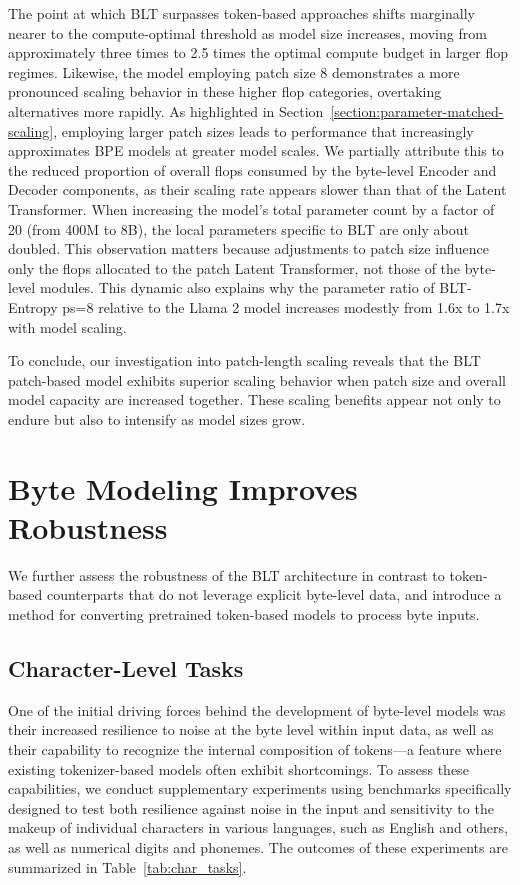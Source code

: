 The point at which {\textsc BLT} surpasses token-based approaches shifts marginally nearer to the compute-optimal threshold as model size increases, moving from approximately three times to 2.5 times the optimal compute budget in larger flop regimes. Likewise, the model employing patch size 8 demonstrates a more pronounced scaling behavior in these higher flop categories, overtaking alternatives more rapidly. As highlighted in Section~\ref{section:parameter-matched-scaling}, employing larger patch sizes leads to performance that increasingly approximates BPE models at greater model scales. We partially attribute this to the reduced proportion of overall flops consumed by the byte-level Encoder and Decoder components, as their scaling rate appears slower than that of the Latent Transformer. When increasing the model’s total parameter count by a factor of 20 (from 400M to 8B), the local parameters specific to {\textsc BLT} are only about doubled. This observation matters because adjustments to patch size influence only the flops allocated to the patch Latent Transformer, not those of the byte-level modules. This dynamic also explains why the parameter ratio of {\textsc BLT}-Entropy ps=8 relative to the Llama 2 model increases modestly from 1.6x to 1.7x with model scaling.

To conclude, our investigation into patch-length scaling reveals that the {\textsc BLT} patch-based model exhibits superior scaling behavior when patch size and overall model capacity are increased together. These scaling benefits appear not only to endure but also to intensify as model sizes grow.

\section{Byte Modeling Improves Robustness} We further assess the robustness of the {\textsc BLT} architecture in contrast to token-based counterparts that do not leverage explicit byte-level data, and introduce a method for converting pretrained token-based models to process byte inputs.

\subsection{Character-Level Tasks}

One of the initial driving forces behind the development of byte-level models was their increased resilience to noise at the byte level within input data, as well as their capability to recognize the internal composition of tokens—a feature where existing tokenizer-based models often exhibit shortcomings. To assess these capabilities, we conduct supplementary experiments using benchmarks specifically designed to test both resilience against noise in the input and sensitivity to the makeup of individual characters in various languages, such as English and others, as well as numerical digits and phonemes. The outcomes of these experiments are summarized in Table~\ref{tab:char_tasks}.

